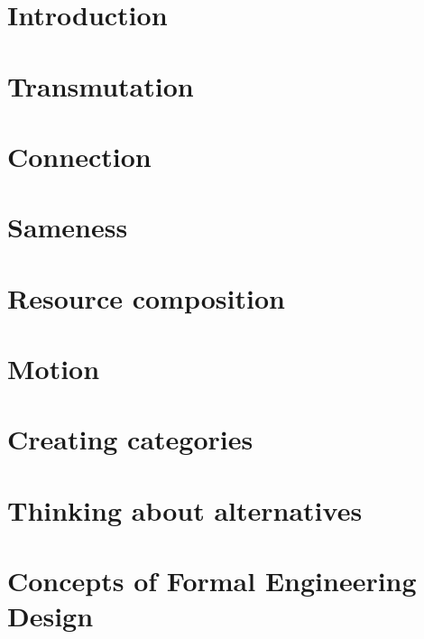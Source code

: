 \documentclass[paper=6in:9in,pagesize=pdftex,
 headinclude=off,footinclude=on,11pt,twoside]{scrbook}
\begin{document}

\setcounter{tocdepth}{1}
\tableofcontents

\chapter{Introduction}

\clearpage

\chapter{Transmutation}

\clearpage

\chapter{Connection}

\clearpage


\chapter{Sameness}

\clearpage

\chapter{Resource composition}

\clearpage

\chapter{Motion}

\clearpage

\chapter{Creating categories}

\clearpage

\chapter{Thinking about alternatives}

\clearpage

\chapter{Concepts of  Formal Engineering Design}

\clearpage
\end{document}

